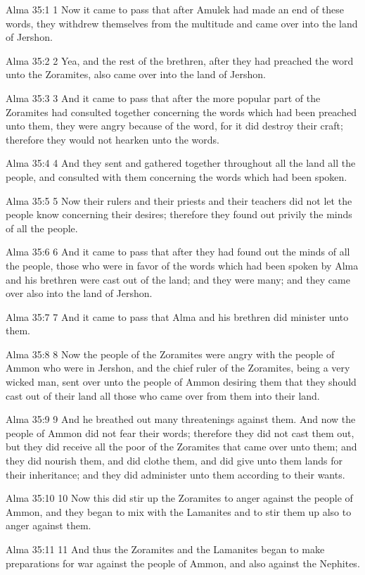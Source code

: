 Alma 35:1
 1 Now it came to pass that after Amulek had made an end of these
words, they withdrew themselves from the multitude and came over
into the land of Jershon.

Alma 35:2
 2 Yea, and the rest of the brethren, after they had preached the
word unto the Zoramites, also came over into the land of Jershon.

Alma 35:3
 3 And it came to pass that after the more popular part of the
Zoramites had consulted together concerning the words which had
been preached unto them, they were angry because of the word, for
it did destroy their craft; therefore they would not hearken unto
the words.

Alma 35:4
 4 And they sent and gathered together throughout all the land
all the people, and consulted with them concerning the words
which had been spoken.

Alma 35:5
 5 Now their rulers and their priests and their teachers did not
let the people know concerning their desires; therefore they
found out privily the minds of all the people.

Alma 35:6
 6 And it came to pass that after they had found out the minds of
all the people, those who were in favor of the words which had
been spoken by Alma and his brethren were cast out of the land;
and they were many; and they came over also into the land of
Jershon.

Alma 35:7
 7 And it came to pass that Alma and his brethren did minister
unto them.

Alma 35:8
 8 Now the people of the Zoramites were angry with the people of
Ammon who were in Jershon, and the chief ruler of the Zoramites,
being a very wicked man, sent over unto the people of Ammon
desiring them that they should cast out of their land all those
who came over from them into their land.

Alma 35:9
 9 And he breathed out many threatenings against them. And now
the people of Ammon did not fear their words; therefore they did
not cast them out, but they did receive all the poor of the
Zoramites that came over unto them; and they did nourish them,
and did clothe them, and did give unto them lands for their
inheritance; and they did administer unto them according to their
wants.

Alma 35:10
 10 Now this did stir up the Zoramites to anger against the
people of Ammon, and they began to mix with the Lamanites and to
stir them up also to anger against them.

Alma 35:11
 11 And thus the Zoramites and the Lamanites began to make
preparations for war against the people of Ammon, and also
against the Nephites.

